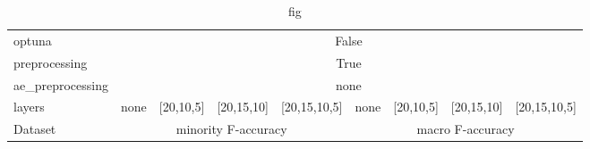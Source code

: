 \begin{table}[hbtb]
    \caption{fig}
    \label{tab:fig2}
    \centering
    \begin{tabular}{l|*{4}{r}|*{4}{r}}

        \hline
        \hline

        optuna&
        \multicolumn{8}{c}{False}\\

        preprocessing&
        \multicolumn{8}{c}{True}\\
        
        ae\_preprocessing&
        \multicolumn{8}{c}{none}\\


        \multicolumn{1}{l|}{layers}&
        none&[20,10,5]&[20,15,10]&[20,15,10,5]&
        none&[20,10,5]&[20,15,10]&[20,15,10,5]\\

        \hline
        \multicolumn{1}{l|}{Dataset}&
        \multicolumn{4}{c|}{minority F-accuracy}&
        \multicolumn{4}{c}{macro F-accuracy} \\
        \hline


\end{tabular}
\end{table}
